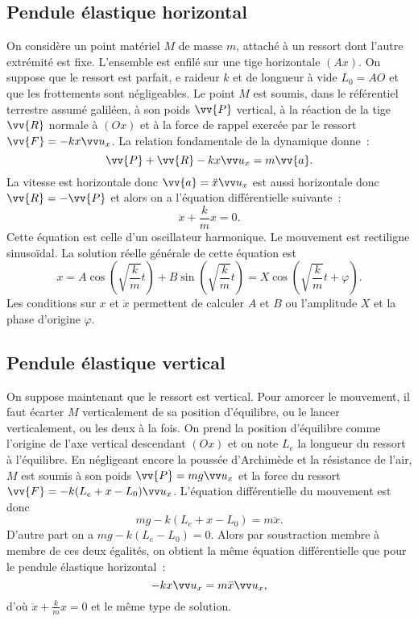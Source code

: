 \subsection{Pendule élastique horizontal}%
\label{chap3-subsec:pendulehorizontal}%
On considère un point matériel \(M\) de masse \(m\), attaché à un ressort dont 
l'autre extrémité est fixe. L'ensemble est enfilé sur une tige horizontale 
\((Ax)\). On suppose que le ressort est parfait, e raideur \(k\) et de longueur 
à vide \(L_0=AO\) et que les frottements sont négligeables. Le point \(M\) est 
soumis, dans le référentiel terrestre assumé galiléen, à son poids \(\vv{P}\) 
vertical, à la réaction de la tige \(\vv{R}\) normale à \((Ox)\) et à la force 
de rappel exercée par le ressort \(\vv{F}=-kx\ux\). La relation fondamentale de 
la dynamique donne~:
\begin{equation}%
  \vv{P}+\vv{R}-kx\ux = m\vv{a}.
\end{equation}%
La vitesse est horizontale donc \(\vv{a} = \ddot{x}\ux\) est aussi horizontale 
donc \(\vv{R}=-\vv{P}\) et alors on a l'équation différentielle suivante~:
\begin{equation}%
  \ddot{x} +\frac{k}{m}x=0.
\end{equation}%
Cette équation est celle d'un oscillateur harmonique. Le mouvement est 
rectiligne sinusoïdal. La solution réelle générale de cette équation est
\begin{equation}%
  x = A \cos\left(\sqrt{\frac{k}{m}} t\right) + B \sin\left(\sqrt{\frac{k}{m}} 
  t\right) = X \cos\left(\sqrt{\frac{k}{m}} t + \varphi\right).
\end{equation}%
Les conditions sur \(x\) et \(\dot{x}\) permettent de calculer \(A\) et \(B\) 
ou l'amplitude \(X\) et la phase d'origine \(\varphi\).

\subsection{Pendule élastique vertical}%
\label{chap3-subsec:pendulevertical}%
On suppose maintenant que le ressort est vertical. Pour amorcer le mouvement, 
il faut écarter \(M\) verticalement de sa position d'équilibre, ou le lancer 
verticalement, ou les deux à la fois. On prend la position d'équilibre comme 
l'origine de l'axe vertical descendant \((Ox)\) et on note \(L_e\) la longueur 
du ressort à l'équilibre. En négligeant encore la poussée d'Archimède et la 
résistance de l'air, \(M\) est soumis à son poids \(\vv{P}=mg\ux\) et la force 
du ressort \(\vv{F}=-k(L_e +x-L_0)\ux\). L'équation différentielle du mouvement 
est donc
\begin{equation}%
  mg -k(L_e +x-L_0) = m\ddot{x}.
\end{equation}%
D'autre part on a \( mg-k(L_e-L_0)=0\). Alors par soustraction membre à membre 
de ces deux égalités, on obtient la même équation différentielle que pour le 
pendule élastique horizontal~:
\begin{equation}%
  -kx \ux = m \ddot{x} \ux,
\end{equation}%
d'où \(\ddot{x} +\frac{k}{m}x=0\) et le même type de solution.

